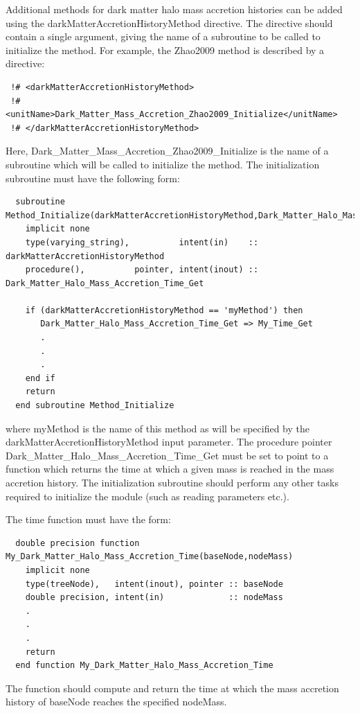Additional methods for dark matter halo mass accretion histories can be added using the {\normalfont \ttfamily darkMatterAccretionHistoryMethod} directive. The directive should contain a single argument, giving the name of a subroutine to be called to initialize the method. For example, the {\normalfont \ttfamily Zhao2009} method is described by a directive:
\begin{verbatim}
 !# <darkMatterAccretionHistoryMethod>
 !#  <unitName>Dark_Matter_Mass_Accretion_Zhao2009_Initialize</unitName>
 !# </darkMatterAccretionHistoryMethod>
\end{verbatim}
Here, {\normalfont \ttfamily Dark\_Matter\_Mass\_Accretion\_Zhao2009\_Initialize} is the name of a subroutine which will be called to initialize the method. The initialization subroutine must have the following form:
\begin{verbatim}
  subroutine Method_Initialize(darkMatterAccretionHistoryMethod,Dark_Matter_Halo_Mass_Accretion_Time_Get)
    implicit none
    type(varying_string),          intent(in)    :: darkMatterAccretionHistoryMethod
    procedure(),          pointer, intent(inout) :: Dark_Matter_Halo_Mass_Accretion_Time_Get
    
    if (darkMatterAccretionHistoryMethod == 'myMethod') then
       Dark_Matter_Halo_Mass_Accretion_Time_Get => My_Time_Get
       .
       .
       .
    end if
    return
  end subroutine Method_Initialize
\end{verbatim}
where {\normalfont \ttfamily myMethod} is the name of this method as will be specified by the {\normalfont \ttfamily darkMatterAccretionHistoryMethod} input parameter. The procedure pointer {\normalfont \ttfamily Dark\_Matter\_Halo\_Mass\_Accretion\_Time\_Get} must be set to point to a function which returns the time at which a given mass is reached in the mass accretion history. The initialization subroutine should perform any other tasks required to initialize the module (such as reading parameters etc.).

The time function must have the form:
\begin{verbatim}
  double precision function My_Dark_Matter_Halo_Mass_Accretion_Time(baseNode,nodeMass)
    implicit none
    type(treeNode),   intent(inout), pointer :: baseNode
    double precision, intent(in)             :: nodeMass
    .
    .
    .
    return
  end function My_Dark_Matter_Halo_Mass_Accretion_Time
\end{verbatim}
The function should compute and return the time at which the mass accretion history of {\normalfont \ttfamily baseNode} reaches the specified {\normalfont \ttfamily nodeMass}.

